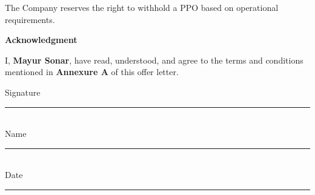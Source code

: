 \documentclass[a4paper,12pt]{article}
\begin{document}
\noindent
The Company reserves the right to withhold a PPO based on operational requirements.

\newpage
\begin{center}
    {\LARGE \textbf{Acknowledgment}} \\
    \vspace{1cm}
\end{center}


\noindent
I, \textbf{Mayur Sonar}, have read, understood, and agree to the terms and conditions mentioned in \textbf{Annexure A} of this offer letter.

\vspace{2cm}
\noindent

Signature \hspace{1cm} \rule{5cm}{0.5pt} \\

Name \hspace{1.7cm} \rule{5cm}{0.5pt} \\

Date \hspace{1.8cm} \rule{5cm}{0.5pt}
\end{document}
